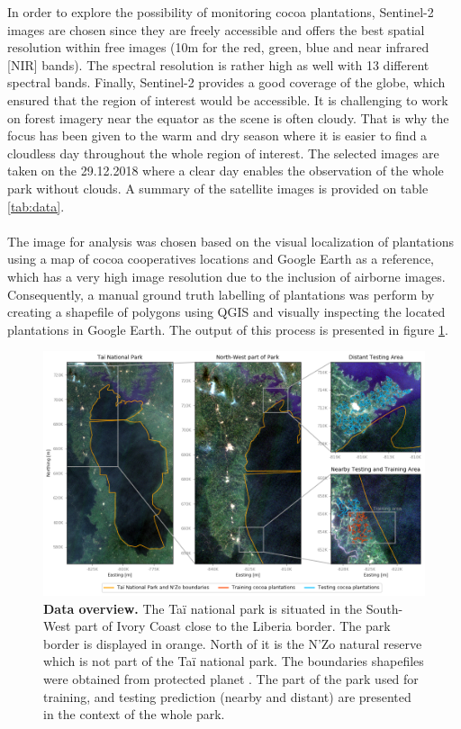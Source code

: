 \documentclass[a4paper, 12pt]{article}
\begin{document}
        In order to explore the possibility of monitoring cocoa plantations, Sentinel-2 images are chosen since they are freely accessible and offers the best spatial resolution within free images (10m for the red, green, blue and near infrared [NIR] bands). The spectral resolution is rather high as well with 13 different spectral bands. Finally, Sentinel-2 provides a good coverage of the globe, which ensured that the region of interest would be accessible. It is challenging to work on forest imagery near the equator as the scene is often cloudy. That is why the focus has been given to the warm and dry season where it is easier to find a cloudless day throughout the whole region of interest. The selected images are taken on the 29.12.2018 where a clear day enables the observation of the whole park without clouds. A summary of the satellite images is provided on table \ref{tab:data}.
        \\
        \\
        The image for analysis was chosen based on the visual localization of plantations using a map of cocoa cooperatives locations \cite{Cooperatives} and Google Earth as a reference, which has a very high image resolution due to the inclusion of airborne images. Consequently, a manual ground truth labelling of plantations was perform by creating a shapefile of polygons using QGIS and visually inspecting the located plantations in Google Earth. The output of this process is presented in figure \ref{fig:overview}.

        \begin{figure}[t]
            \centering
            \includegraphics[width=1\textwidth]{../Figures/overview.png}
            \caption{\textbf{Data overview.} The Taï national park is situated in the South-West part of Ivory Coast close to the Liberia border. The park border is displayed in orange. North of it is the N'Zo natural reserve which is not part of the Taï national park. The boundaries shapefiles were obtained from protected planet \cite{unep-wcmc_and_iucn_protected_2019, unep-wcmc_and_iucn_protected_2019-1}. The part of the park used for training, and testing prediction (nearby and distant) are presented in the context of the whole park.}
            \label{fig:overview}
        \end{figure}
\end{document}
